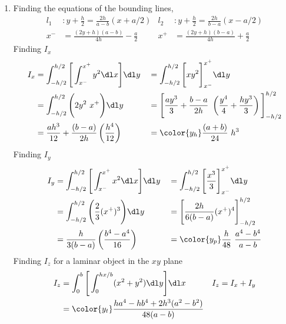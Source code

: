 \begin{enumerate}
    \item Finding the equations of the bounding lines,
          \begin{align}
              l_1 & : y + \frac{h}{2} = \frac{2h}{a - b}(x + a/2) &
              l_2 & : y + \frac{h}{2} = \frac{2h}{b-a}(x - a/2)     \\
              x^- & = \frac{(2y + h)(a-b)}{4h} - \frac{a}{2}      &
              x^+ & = \frac{(2y + h)(b-a)}{4h} + \frac{a}{2}
          \end{align}
          Finding $ I_x $
          \begin{align}
              I_x     & = \int_{-h/2}^{h/2} \Bigg[\int_{x^-}^{x^+} y^2 \dl x \Bigg]
              \dl y   &
                      & = \int_{-h/2}^{h/2} \Bigg[ xy^2\Bigg]_{x^-}^{x^+}
              \dl y                                                                   \\
                      & = \int_{-h/2}^{h/2} \Bigg(2y^2\ x^+\Bigg) \dl y             &
                      & = \Bigg[ \frac{ay^3}{3} + \frac{b-a}{2h}\ \left( \frac{y^4}
              {4} + \frac{hy^3}{3} \right) \Bigg]_{-h/2}^{h/2}                        \\
                      & = \frac{ah^3}{12} + \frac{(b-a)}{2h} \left( \frac{h^4}{12}
              \right) &
                      & = \color{y_h} \frac{(a + b)}{24}\ h^3
          \end{align}
          Finding $ I_y $
          \begin{align}
              I_y   & = \int_{-h/2}^{h/2} \Bigg[\int_{x^-}^{x^+} x^2 \dl x \Bigg]
              \dl y &
                    & = \int_{-h/2}^{h/2} \Bigg[ \frac{x^3}{3} \Bigg]_{x^-}^{x^+}
              \dl y                                                                 \\
                    & = \int_{-h/2}^{h/2} \Bigg(\frac{2}{3} (x^+)^3\Bigg) \dl y   &
                    & = \Bigg[ \frac{2h}{6(b-a)} (x^+)^4 \Bigg]_{-h/2}^{h/2}        \\
                    & = \frac{h}{3(b-a)} \left( \frac{b^4 - a^4}{16} \right)      &
                    & = \color{y_p} \frac{h}{48}\ \frac{a^4 - b^4}{a - b}
          \end{align}
          Finding $ I_z $ for a laminar object in the $ xy $ plane
          \begin{align}
              I_z   & = \int_{0}^{b} \Bigg[\int_{0}^{hx/b} (x^2 + y^2) \dl y\Bigg]
              \dl x &
              I_z   & = I_x + I_y                                                   \\
                    & = \color{y_t} \frac{ha^4 - hb^4 + 2h^3(a^2 - b^2)}{48(a - b)}
          \end{align}


\end{enumerate}
